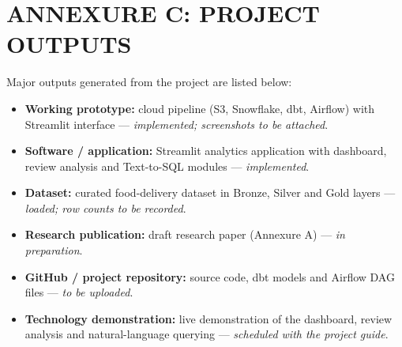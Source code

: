 \documentclass[12pt,a4paper]{report}
\begin{document}
\clearpage
\chapter*{ANNEXURE C: PROJECT OUTPUTS}

\noindent Major outputs generated from the project are listed below:
\begin{itemize}[leftmargin=2em]
\item \textbf{Working prototype:} cloud pipeline (S3, Snowflake, dbt, Airflow) with Streamlit interface --- \emph{implemented; screenshots to be attached}.
\item \textbf{Software / application:} Streamlit analytics application with dashboard, review analysis and Text-to-SQL modules --- \emph{implemented}.
\item \textbf{Dataset:} curated food-delivery dataset in Bronze, Silver and Gold layers --- \emph{loaded; row counts to be recorded}.
\item \textbf{Research publication:} draft research paper (Annexure A) --- \emph{in preparation}.
\item \textbf{GitHub / project repository:} source code, dbt models and Airflow DAG files --- \emph{to be uploaded}.
\item \textbf{Technology demonstration:} live demonstration of the dashboard, review analysis and natural-language querying --- \emph{scheduled with the project guide}.
\end{itemize}
\end{document}
